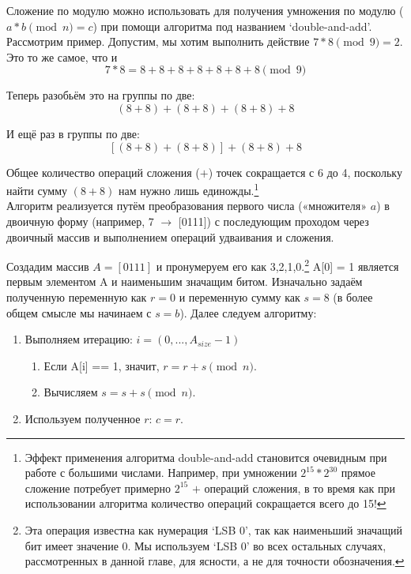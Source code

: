 Сложение по модулю можно использовать для получения умножения по модулю \linebreak ($a*b \pmod n = c$) при помощи алгоритма под названием `double-and-add'. Рассмотрим пример. Допустим, мы хотим выполнить действие $7*8 \pmod 9 = 2$. Это то же самое, что и
\[7*8 = 8+8+8+8+8+8+8 \pmod 9\]

Теперь разобьём это на группы по две: 
\[(8+8) + (8+8) + (8+8) + 8\]

И ещё раз в группы по две:
\[[(8+8) + (8+8)] + (8+8) + 8\]

Общее количество операций сложения ($+$) точек сокращается с 6 до 4, поскольку найти сумму $(8+8)$ нам нужно лишь единожды.\footnote{Эффект применения алгоритма double-and-add становится очевидным при работе с большими числами. Например, при умножении $2^{15} * 2^{30}$ прямое сложение потребует примерно $2^{15}$ $+$ операций сложения, в то время как при использовании алгоритма количество операций сокращается всего до 15!}\\

Алгоритм реализуется путём преобразования первого числа («множителя» $a$) в двоичную форму (например, 7 $\rightarrow$ [0111]) с последующим проходом через двоичный массив и выполнени\-ем операций удваивания и сложения. 

Создадим массив $A = [0111]$ и пронумеруем его как 3,2,1,0.\footnote{Эта операция известна как нумерация `LSB 0', так как наименьший значащий бит имеет значение 0. Мы используем `LSB 0' во всех остальных случаях, рассмотренных в данной главе, для ясности, а не для точности обозначения.} A[0] = 1 является первым элементом A и наименьшим значащим битом. Изначально задаём полученную переменную как $r = 0$ и переменную сумму как $s = 8$ (в более общем смысле мы начинаем с $s = b$). Далее следуем алгоритму:
\begin{enumerate}
	\item Выполняем итерацию: $i = (0,...,A_{size} - 1)$
	\begin{enumerate}
		\item Если A[i] == 1, значит, $r = r + s \pmod n$.
		\item Вычисляем $s = s + s \pmod n$.
	\end{enumerate}
	\item Используем полученное $r$: $c = r$.
\end{enumerate}

